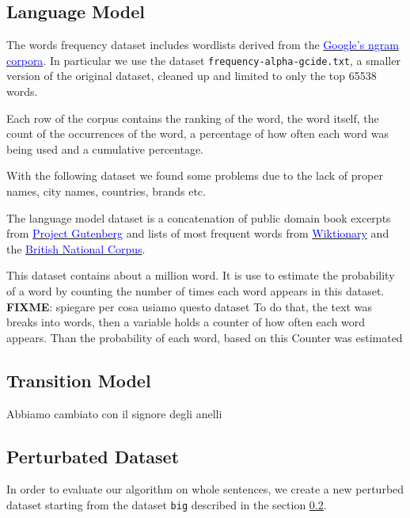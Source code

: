 \subsection{Language Model}
The words frequency dataset includes wordlists derived from the \href{https://books.google.com/ngrams/}{ 
\textcolor{blue}{Google's ngram corpora}}. In particular we use the dataset \texttt{frequency-alpha-gcide.txt}, a smaller 
version of the original dataset, cleaned up and limited to only the top \num{65538} words.

Each row of the corpus contains the ranking of the word, the word itself, the count of the occurrences of the word, a 
percentage of how often each word was being used and a cumulative percentage.

With the following dataset we found some problems due to the lack of proper names, city names, countries, brands etc.

The language model dataset is a concatenation of public domain book excerpts from 
\href{http://www.gutenberg.org/wiki/Main_Page}{ \textcolor{blue}{Project Gutenberg}}  and lists of most frequent words 
from \href{https://en.wiktionary.org/wiki/Wiktionary:Frequency_lists}{ \textcolor{blue}{Wiktionary}} and the 
\href{http://www.kilgarriff.co.uk/bnc-readme.html}{\textcolor{blue}{British National Corpus}}. 

This dataset contains about a million word. It is use to estimate the probability of a word by counting the number of times 
each word appears in this dataset. \textbf{FIXME}: spiegare per cosa usiamo questo dataset  To do that, the text was 
breaks into words, then a variable holds a counter of how often each word appears. Than the  probability of each word, 
based on this Counter was estimated

\subsection{Transition Model}
\label{subsection:languagemodel}
Abbiamo cambiato con il signore degli anelli



\subsection{Perturbated Dataset}
In order to evaluate our algorithm on whole sentences, we create a new perturbed dataset starting from the dataset 
\texttt{big} described in the section \ref{subsection:languagemodel}.

